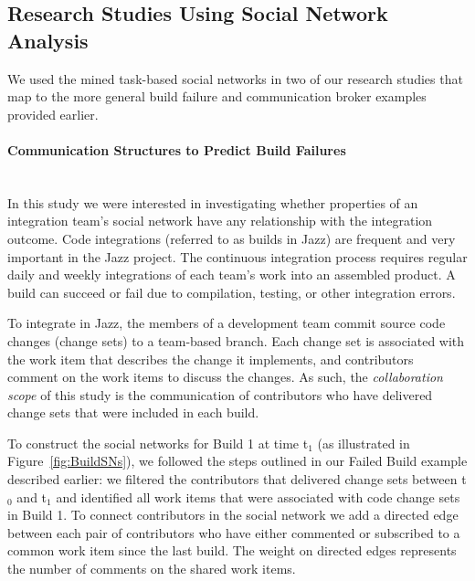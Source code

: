 \documentclass[12pt,oneside]{book}
\newcommand{\people}{project member}
\newcommand{\jazztm}{Jazz}
\begin{document}


\subsection{Research Studies Using Social Network Analysis}
We used the mined task-based social networks in two of our research studies that
map to the more general build failure \cite{wolf:tr2008} and communication
broker \cite{Nguyen:2008Distance} examples provided earlier.

\paragraph{Communication Structures to Predict Build Failures}
\ \\
In this study we were interested in investigating whether properties of an
integration team's social network have any relationship with the integration
outcome. Code integrations (referred  to  as builds in Jazz)  are frequent and
very important in the Jazz project. The continuous integration process requires
regular daily and weekly integrations of each team's work into an assembled
product. A build can succeed or fail due to compilation, testing, or other
integration errors.

To integrate in \jazztm, the members of a development team commit source code
changes (change sets) to a team-based branch. Each change set is associated with
the work item that describes the change it implements, and contributors comment
on the work items to discuss the changes. As such, the \emph{collaboration scope}
of this study is the communication of contributors who have delivered change sets
that were included in each build. 


To construct the social networks for Build 1 at time t$_1$ (as illustrated in
Figure~\ref{fig:BuildSNs}), we followed the steps outlined in our Failed Build
example described earlier: we filtered the contributors that delivered change
sets between t$_0$ and t$_1$ and identified all work items that were associated
with code change sets in Build 1. To connect contributors in the social network
we add a directed edge between each pair of contributors who have either
commented or subscribed to a common work item since the last build. The weight on
directed edges represents the number of comments on the shared work items.
\end{document}
